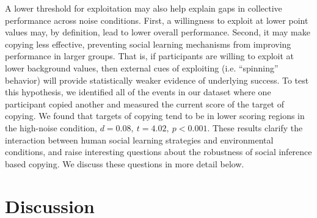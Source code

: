 \documentclass[12pt,letterpaper]{article}
\begin{document}
A lower threshold for exploitation may also help explain gaps in collective performance across noise conditions. 
First, a willingness to exploit at lower point values may, by definition, lead to lower overall performance. 
Second, it may make copying less effective, preventing social learning mechanisms from improving performance in larger groups.
That is, if participants are willing to exploit at lower background values, then external cues of exploiting (i.e. ``spinning'' behavior) will provide statistically weaker evidence of underlying success.
To test this hypothesis, we identified all of the events in our dataset where one participant copied another and measured the current score of the target of copying.
We found that targets of copying tend to be in lower scoring regions in the high-noise condition, $d=0.08,~t=4.02,~p<0.001$.
These results clarify the interaction between human social learning strategies and environmental conditions, and raise interesting questions about the robustness of social inference based copying.
We discuss these questions in more detail below.

\section{Discussion}
\end{document}
